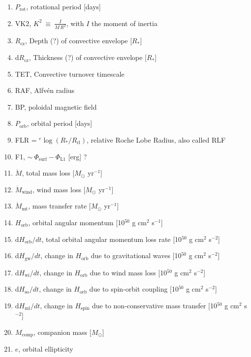 \begin{enumerate}
\item $P_\mathrm{rot}$, rotational period [days] 
\item VK2, $K^2 ~\equiv~ \frac{I}{M\,R^2}$, with $I$ the moment of inertia
\item $R_\mathrm{cz}$, Depth (?) of convective envelope [$R_*$]
\item d$R_\mathrm{cz}$, Thickness (?) of convective envelope [$R_*$]
\item TET, Convective turnover timescale
\item RAF, Alfv\'en radius 
\item BP, poloidal magnetic field

\item $P_\mathrm{orb}$, orbital period [days] 
\item FLR = $^e\log\left(R_*/R_\mathrm{rl}\right)$, relative Roche Lobe Radius, also called RLF
\item F1, $\sim~\Phi_\mathrm{surf} - \Phi_\mathrm{L1}$ [erg] ?
\item $\dot{M}$, total mass loss [$M_\odot$ yr$^{-1}$]
\item $\dot{M}_\mathrm{wind}$, wind mass loss [$M_\odot$ yr$^{-1}$]
\item $\dot{M}_\mathrm{mt}$, mass transfer rate [$M_\odot$ yr$^{-1}$]
\item $H_\mathrm{orb}$, orbital angular momentum [10$^{50}$ g cm$^2$ s$^{-1}$] 
\item d$H_\mathrm{orb}/dt$, total orbital angular momentum loss rate [10$^{50}$ g cm$^2$ s$^{-2}$]
\item d$H_\mathrm{gw}/dt$, change in $H_\mathrm{orb}$ due to gravitational waves [10$^{50}$ g cm$^2$ s$^{-2}$]
\item d$H_\mathrm{wi}/dt$, change in $H_\mathrm{orb}$ due to wind mass loss [10$^{50}$ g cm$^2$ s$^{-2}$]
\item d$H_\mathrm{so}/dt$, change in $H_\mathrm{orb}$ due to spin-orbit coupling [10$^{50}$ g cm$^2$ s$^{-2}$]
\item d$H_\mathrm{ml}/dt$, change in $H_\mathrm{spin}$ due to non-conservative mass transfer [10$^{50}$ g cm$^2$ s$^{-2}$]
\item $M_\mathrm{comp}$, companion mass [$M_\odot$] 
\item $e$, orbital ellipticity


\end{enumerate}
